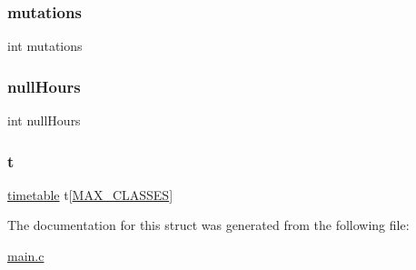 \hypertarget{structindividual_a935150bbe2179cbd3ea7428dd8d459c1}{}\label{structindividual_a935150bbe2179cbd3ea7428dd8d459c1} 
\subsubsection{\texorpdfstring{mutations}{mutations}}
{\footnotesize\ttfamily int mutations}

\hypertarget{structindividual_ac45c43cafaa02d7cab79893188a9164d}{}\label{structindividual_ac45c43cafaa02d7cab79893188a9164d} 
\subsubsection{\texorpdfstring{null\+Hours}{nullHours}}
{\footnotesize\ttfamily int null\+Hours}

\hypertarget{structindividual_a80bde47459d4d03a7f1ed0c6fb5e2ffb}{}\label{structindividual_a80bde47459d4d03a7f1ed0c6fb5e2ffb} 
\subsubsection{\texorpdfstring{t}{t}}
{\footnotesize\ttfamily \hyperlink{structtimetable}{timetable} t\mbox{[}\hyperlink{main_8c_aa322a61b17e1d56852d53d5ef6a728c6}{M\+A\+X\+\_\+\+C\+L\+A\+S\+S\+ES}\mbox{]}}



The documentation for this struct was generated from the following file\+:\begin{DoxyCompactItemize}
\item 
\hyperlink{main_8c}{main.\+c}\end{DoxyCompactItemize}
